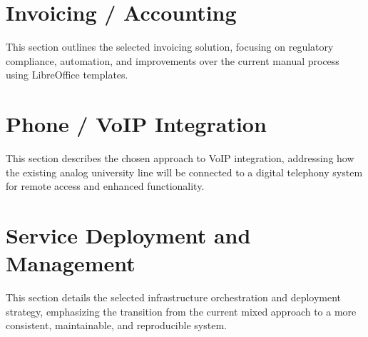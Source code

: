 \section{Invoicing / Accounting}

This section outlines the selected invoicing solution, focusing on regulatory compliance, automation, and improvements over the current manual process using LibreOffice templates.

\section{Phone / VoIP Integration}

This section describes the chosen approach to VoIP integration, addressing how the existing analog university line will be connected to a digital telephony system for remote access and enhanced functionality.

\section{Service Deployment and Management}

This section details the selected infrastructure orchestration and deployment strategy, emphasizing the transition from the current mixed approach to a more consistent, maintainable, and reproducible system.
